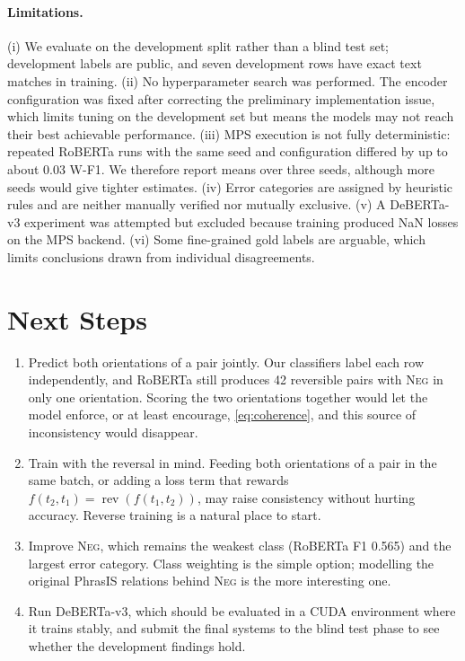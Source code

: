 \documentclass[11pt,a4paper]{article}
\newcommand{\NEG}{\textsc{Neg}}
\DeclareMathOperator{\rev}{rev}
\begin{document}
\paragraph{Limitations.}
(i) We evaluate on the development split rather than a blind test set; development labels are public, and seven development rows have exact text matches in training.
(ii) No hyperparameter search was performed. The encoder configuration was fixed after correcting the preliminary implementation issue, which limits tuning on the development set but means the models may not reach their best achievable performance.
(iii) MPS execution is not fully deterministic: repeated RoBERTa runs with the same seed and configuration differed by up to about 0.03 W-F1. We therefore report means over three seeds, although more seeds would give tighter estimates.
(iv) Error categories are assigned by heuristic rules and are neither manually verified nor mutually exclusive.
(v) A DeBERTa-v3 experiment was attempted but excluded because training produced NaN losses on the MPS backend.
(vi) Some fine-grained gold labels are arguable, which limits conclusions drawn from individual disagreements.

\section{Next Steps}
\label{sec:next}

\begin{enumerate}
  \item Predict both orientations of a pair jointly. Our classifiers label each row independently, and RoBERTa still produces 42 reversible pairs with \NEG{} in only one orientation. Scoring the two orientations together would let the model enforce, or at least encourage, \cref{eq:coherence}, and this source of inconsistency would disappear.
  \item Train with the reversal in mind. Feeding both orientations of a pair in the same batch, or adding a loss term that rewards $f(t_2,t_1)=\rev(f(t_1,t_2))$, may raise consistency without hurting accuracy. Reverse training \citep{golovneva2024reverse} is a natural place to start.
  \item Improve \NEG{}, which remains the weakest class (RoBERTa F1 0.565) and the largest error category. Class weighting is the simple option; modelling the original PhrasIS relations behind \NEG{} is the more interesting one.
  \item Run DeBERTa-v3, which should be evaluated in a CUDA environment where it trains stably, and submit the final systems to the blind test phase to see whether the development findings hold.
\end{enumerate}



\end{document}
